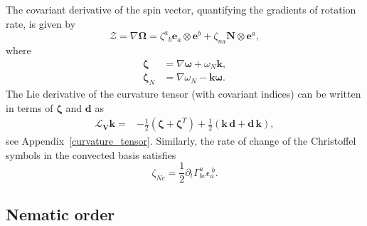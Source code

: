 The covariant derivative of the spin vector, quantifying the gradients of rotation rate, is given by
\begin{equation}
	\bm{\mathcal{Z}} =\nabla \bm{\Omega}  = \zeta^a{}_b\bm{e}_a \otimes \bm{e}^b + \zeta_{na} \bm{N} \otimes \bm{e}^a,
\end{equation}
where
\begin{align}
	\bm{\zeta} &= \nabla \bm{\omega}+\omega_N\bm{k},\label{eq6:xi}\\
	\bm{\zeta}_N &= \nabla \omega_N-\bm{k}\bm{\omega}\label{eq6:xiN}.
\end{align}
The Lie derivative of the curvature tensor (with covariant indices) can be written in terms of $\bm{\zeta}$ and $\bm{d}$ as
\begin{align} \label{26_II}
	\mathcal{L}_{\bm{V}} \bm{k}  = & -\frac{1}{2} \left(\bm{\zeta} +\bm{\zeta}^T\right)+ \frac{1}{2}\left(\bm{k}\,\bm{d} +\bm{d}\,\bm{k}\right),
\end{align}
see Appendix~\ref{curvature_tensor}.
Similarly, the rate of change of the Christoffel symbols in the convected basis satisfies
\begin{equation}\label{25_II}
	 \zeta_{Nc} = \frac{1}{2}\partial_t\Gamma^a_{bc} \epsilon_a^{~b} .
\end{equation}

\subsection{Nematic order}


